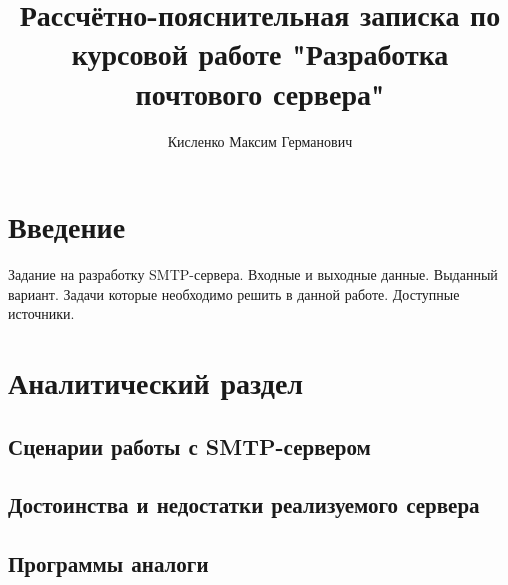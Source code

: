 \documentclass[a4paper,12pt]{report}
\title{Рассчётно-пояснительная записка по курсовой работе "Разработка почтового сервера" \textnumero 1}
\author{Кисленко Максим Германович}
\begin{document}
\maketitle

\tableofcontents

\chapter*{Введение}



Задание на разработку SMTP-сервера.
Входные и выходные данные.
Выданный вариант.
Задачи которые необходимо решить в данной работе.
Доступные источники.




\chapter{Аналитический раздел}

\section{Сценарии работы с SMTP-сервером}

\section{Достоинства и недостатки реализуемого сервера}

\section{Программы аналоги}
\end{document}
